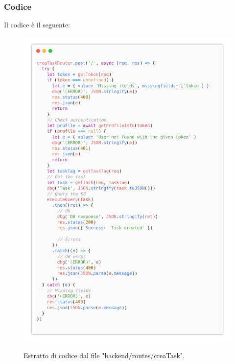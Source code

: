 \documentclass{report}
\begin{document}
\subsubsection*{Codice}

Il codice è il seguente:
\begin{figure}[H]
	\centering\includegraphics[width=1\textwidth]{images/code_crea_task.png}

	Estratto di codice dal file "backend/routes/creaTask".
\end{figure}
\end{document}
